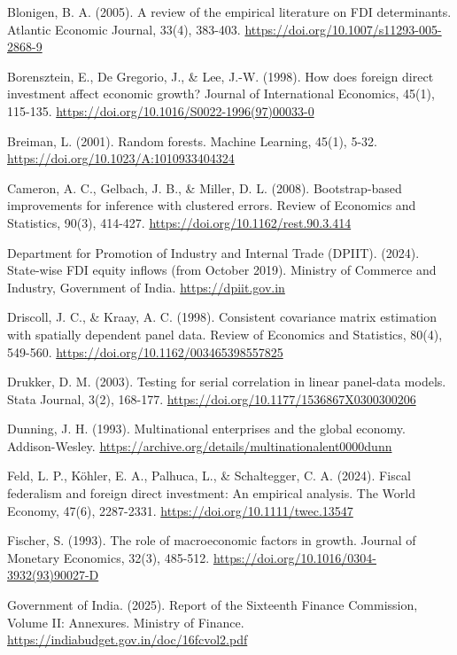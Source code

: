 \documentclass[12pt,a4paper]{article}
\begin{document}
\hangindent=0.5in
Blonigen, B. A. (2005). A review of the empirical literature on FDI determinants. Atlantic Economic Journal, 33(4), 383-403. \url{https://doi.org/10.1007/s11293-005-2868-9}

\hangindent=0.5in
Borensztein, E., De Gregorio, J., \& Lee, J.-W. (1998). How does foreign direct investment affect economic growth? Journal of International Economics, 45(1), 115-135. \url{https://doi.org/10.1016/S0022-1996(97)00033-0}

\hangindent=0.5in
Breiman, L. (2001). Random forests. Machine Learning, 45(1), 5-32. \url{https://doi.org/10.1023/A:1010933404324}

\hangindent=0.5in
Cameron, A. C., Gelbach, J. B., \& Miller, D. L. (2008). Bootstrap-based improvements for inference with clustered errors. Review of Economics and Statistics, 90(3), 414-427. \url{https://doi.org/10.1162/rest.90.3.414}

\hangindent=0.5in
Department for Promotion of Industry and Internal Trade (DPIIT). (2024). State-wise FDI equity inflows (from October 2019). Ministry of Commerce and Industry, Government of India. \url{https://dpiit.gov.in}

\hangindent=0.5in
Driscoll, J. C., \& Kraay, A. C. (1998). Consistent covariance matrix estimation with spatially dependent panel data. Review of Economics and Statistics, 80(4), 549-560. \url{https://doi.org/10.1162/003465398557825}

\hangindent=0.5in
Drukker, D. M. (2003). Testing for serial correlation in linear panel-data models. Stata Journal, 3(2), 168-177. \url{https://doi.org/10.1177/1536867X0300300206}

\hangindent=0.5in
Dunning, J. H. (1993). Multinational enterprises and the global economy. Addison-Wesley. \url{https://archive.org/details/multinationalent0000dunn}

\hangindent=0.5in
Feld, L. P., Köhler, E. A., Palhuca, L., \& Schaltegger, C. A. (2024). Fiscal federalism and foreign direct investment: An empirical analysis. The World Economy, 47(6), 2287-2331. \url{https://doi.org/10.1111/twec.13547}

\hangindent=0.5in
Fischer, S. (1993). The role of macroeconomic factors in growth. Journal of Monetary Economics, 32(3), 485-512. \url{https://doi.org/10.1016/0304-3932(93)90027-D}

\hangindent=0.5in
Government of India. (2025). Report of the Sixteenth Finance Commission, Volume II: Annexures. Ministry of Finance. \url{https://indiabudget.gov.in/doc/16fcvol2.pdf}
\end{document}
